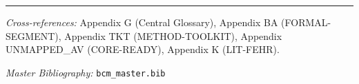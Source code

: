 
\vspace{1em}
\hrule
\vspace{0.5em}

\noindent\textit{Cross-references:}
Appendix G (Central Glossary),
Appendix BA (FORMAL-SEGMENT),
Appendix TKT (METHOD-TOOLKIT),
Appendix UNMAPPED_AV (CORE-READY),
Appendix K (LIT-FEHR).

\noindent\textit{Master Bibliography:} \texttt{bcm\_master.bib}

